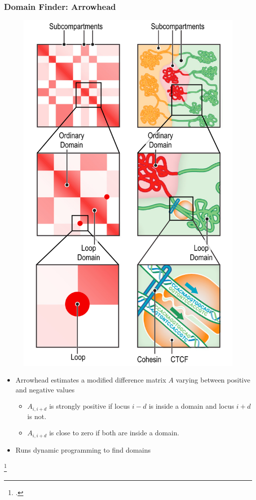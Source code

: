 \documentclass[12pt]{beamer}
\begin{document}
\begin{frame}
\frametitle{Domain Finder: Arrowhead}

\begin{figure}
\includegraphics[scale=0.4]{arrowhead.png}
\end{figure}

\begin{itemize}
\item Arrowhead estimates a modified difference matrix $A$ varying between positive
  and negative values
\begin{itemize}
\item $A_{i, i+d}$ is strongly positive if locus $i-d$ is inside a domain
and locus $i+d$ is not.
\vspace{0.05cm}
\item $A_{i, i+d}$ is close to zero if both are inside a domain.
\end{itemize} 
\vspace{0.1cm}
\item Runs dynamic programming to find domains
\end{itemize}

\footcitetext{rao2014}

\end{frame}
\end{document}
